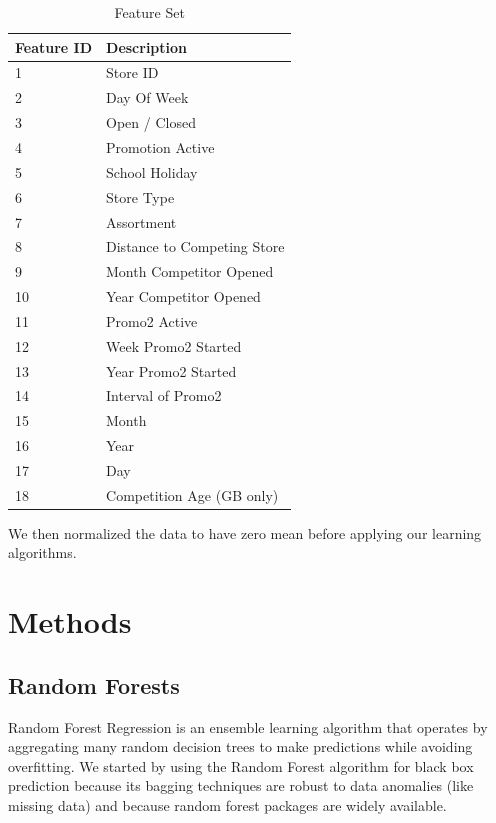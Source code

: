 \documentclass[twoside]{article}
\begin{document}
\begin{multicols}{2}
\begin{table}[H]
\caption{Feature Set}
\centering
\begin{tabular}{ll}
\toprule
\cmidrule(r){1-2}
Feature ID & Description \\
\midrule
1 &  Store ID \\
2 &  Day Of Week \\
3 & Open / Closed\\
4 &  Promotion Active \\
5 & School Holiday\\
6 & Store Type \\
7 & Assortment \\
8 & Distance to Competing Store\\
9 & Month Competitor Opened \\
10 & Year Competitor Opened\\
11 & Promo2 Active \\
12 & Week Promo2 Started\\
13 & Year Promo2 Started\\
14 & Interval of Promo2\\
15 & Month \\
16 & Year \\
17 & Day \\
18 & Competition Age (GB only)\\
\bottomrule
\end{tabular}
\end{table}

\noindent We then normalized the data to have zero mean before applying our learning algorithms.




\section{Methods}

\subsection{Random Forests}

Random Forest Regression is an ensemble learning algorithm that operates by aggregating many random decision trees to make predictions while avoiding overfitting. We started by using the Random Forest algorithm for black box prediction because its bagging techniques are robust to data anomalies (like missing data) and because random forest packages are widely available.


\end{multicols}
\end{document}
